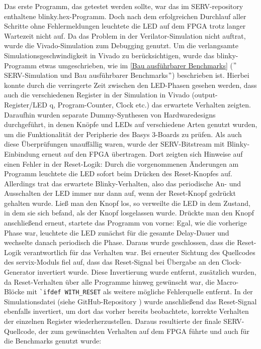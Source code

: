     Das erste Programm, das getestet werden sollte, war das im SERV-repository enthaltene blinky.hex-Programm.
    Doch nach dem erfolgreichen Durchlauf aller Schritte ohne Fehlermeldungen leuchtete die LED auf dem FPGA trotz langer Wartezeit nicht auf.
    Da das Problem in der Verilator-Simulation nicht auftrat, wurde die Vivado-Simulation zum Debugging genutzt.
    Um die verlangsamte Simulationsgeschwindigkeit in Vivado zu berücksichtigen, wurde das blinky-Programm etwas umgeschrieben, wie im \cref{Bau ausführbarer Benchmarks} (\("\)SERV-Simulation und Bau ausführbarer Benchmarks\("\)) beschrieben ist.
    Hierbei konnte durch die verringerte Zeit zwischen den LED-Phasen gesehen werden, dass auch die verschiedenen Register in der Simulation in Vivado (output-Register/LED q, Program-Counter, Clock etc.) das erwartete Verhalten zeigten.
    Daraufhin wurden separate Dummy-Synthesen von Hardwaredesigns durchgeführt, in denen Knöpfe und LEDs auf verschiedene Arten genutzt wurden, um die Funktionalität der Peripherie des Basys 3-Boards zu prüfen.
    Als auch diese Überprüfungen unauffällig waren, wurde der SERV-Bitstream mit Blinky-Einbindung erneut auf den FPGA übertragen.
    Dort zeigten sich Hinweise auf einen Fehler in der Reset-Logik:
    Durch die vorgenommenen Änderungen am Programm leuchtete die LED sofort beim Drücken des Reset-Knopfes auf.
    Allerdings trat das erwartete Blinky-Verhalten, also das periodische An- und Ausschalten der LED immer nur dann auf, wenn der Reset-Knopf gedrückt gehalten wurde.
    Ließ man den Knopf los, so verweilte die LED in dem Zustand, in dem sie sich befand, als der Knopf losgelassen wurde.
    Drückte man den Knopf anschließend erneut, startete das Programm von vorne: Egal, wie die vorherige Phase war, leuchtete die LED zunächst für die gesamte Delay-Dauer und wechselte danach periodisch die Phase.
    Daraus wurde geschlossen, dass die Reset-Logik verantwortlich für das Verhalten war.
    Bei erneuter Sichtung des Quellcodes des servix-Moduls fiel auf, dass das Reset-Signal bei Übergabe an den Clock-Generator invertiert wurde.
    Diese Invertierung wurde entfernt, zusätzlich wurden, da Reset-Verhalten über alle Programme hinweg gewünscht war, die Macro-Blöcke mit \verb|`ifdef WITH_RESET| als weitere mögliche Fehlerquelle entfernt.
    In der Simulationsdatei (siehe GitHub-Repository \parencite{GitHub-Bachelorarbeit}) wurde anschließend das Reset-Signal ebenfalls invertiert, um dort das vorher bereits beobachtete, korrekte Verhalten der einzelnen Register wiederherzustellen.
    Daraus resultierte der finale SERV-Quellcode, der zum gewünschten Verhalten auf dem FPGA führte und auch für die Benchmarks genutzt wurde:
